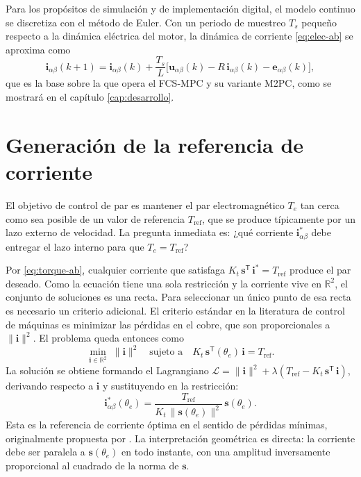 \documentclass[../../../Tesis_JALS_Maestria.tex]{subfiles}
\begin{document}
Para los propósitos de simulación y de implementación digital, el modelo continuo se discretiza con el método de Euler. Con un periodo de muestreo $T_s$ pequeño respecto a la dinámica eléctrica del motor, la dinámica de corriente \eqref{eq:elec-ab} se aproxima como
\begin{equation}
    \mathbf{i}_{\alpha\beta}(k+1) = \mathbf{i}_{\alpha\beta}(k) + \frac{T_s}{L}\bigl[\mathbf{u}_{\alpha\beta}(k) - R\,\mathbf{i}_{\alpha\beta}(k) - \mathbf{e}_{\alpha\beta}(k)\bigr],
    \label{eq:modelo-discreto}
\end{equation}
que es la base sobre la que opera el FCS-MPC y su variante M2PC, como se mostrará en el capítulo \ref{cap:desarrollo}.

\section{Generación de la referencia de corriente}
\label{sec:iref}

El objetivo de control de par es mantener el par electromagnético $T_e$ tan cerca como sea posible de un valor de referencia $T_\mathrm{ref}$, que se produce típicamente por un lazo externo de velocidad. La pregunta inmediata es: ¿qué corriente $\mathbf{i}_{\alpha\beta}^*$ debe entregar el lazo interno para que $T_e = T_\mathrm{ref}$?

Por \eqref{eq:torque-ab}, cualquier corriente que satisfaga $K_t\,\mathbf{s}^{\mathsf T}\,\mathbf{i}^* = T_\mathrm{ref}$ produce el par deseado. Como la ecuación tiene una sola restricción y la corriente vive en $\mathbb{R}^2$, el conjunto de soluciones es una recta. Para seleccionar un único punto de esa recta es necesario un criterio adicional. El criterio estándar en la literatura de control de máquinas \citep{lehuy1986minimization, hung1993currents, park2000minimum, krishnan2009pmbldc} es minimizar las pérdidas en el cobre, que son proporcionales a $\|\mathbf{i}\|^2$. El problema queda entonces como
\begin{equation}
    \min_{\mathbf{i}\in\mathbb{R}^2}\; \|\mathbf{i}\|^2
    \quad \text{sujeto a} \quad
    K_t\,\mathbf{s}^{\mathsf T}(\theta_e)\,\mathbf{i} = T_\mathrm{ref}.
    \label{eq:opt-iref}
\end{equation}
La solución se obtiene formando el Lagrangiano $\mathcal{L} = \|\mathbf{i}\|^2 + \lambda(T_\mathrm{ref} - K_t\,\mathbf{s}^{\mathsf T}\,\mathbf{i})$, derivando respecto a $\mathbf{i}$ y sustituyendo en la restricción:
\begin{equation}
    \mathbf{i}_{\alpha\beta}^*(\theta_e) = \frac{T_\mathrm{ref}}{K_t\,\|\mathbf{s}(\theta_e)\|^2}\,\mathbf{s}(\theta_e).
    \label{eq:iref-optima}
\end{equation}
Esta es la referencia de corriente óptima en el sentido de pérdidas mínimas, originalmente propuesta por \citet{lehuy1986minimization}. La interpretación geométrica es directa: la corriente debe ser paralela a $\mathbf{s}(\theta_e)$ en todo instante, con una amplitud inversamente proporcional al cuadrado de la norma de $\mathbf{s}$.
\end{document}
